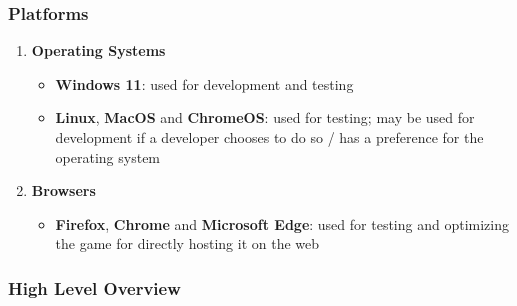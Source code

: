 \documentclass[11pt, a4paper]{article}
\begin{document}
\subsubsection{Platforms}

\begin{enumerate}
    \item \textbf{Operating Systems}
    \begin{itemize}
        \item \textbf{Windows 11}: used for development and testing
        \item \textbf{Linux}, \textbf{MacOS} and \textbf{ChromeOS}: used for testing; may be used for development if a developer chooses to do so / has a preference for the operating system
    \end{itemize}
    \item \textbf{Browsers}
    \begin{itemize}
        \item \textbf{Firefox}, \textbf{Chrome} and \textbf{Microsoft Edge}: used for testing and optimizing the game for directly hosting it on the web
    \end{itemize}
\end{enumerate}

\newpage

\subsubsection{High Level Overview}
\end{document}
